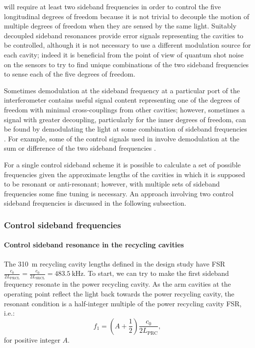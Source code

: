\ETLF{} will require at least two sideband frequencies in order to control the five longitudinal degrees of freedom because it is not trivial to decouple the motion of multiple degrees of freedom when they are sensed by the same light. Suitably decoupled sideband resonances provide error signals representing the cavities to be controlled, although it is not necessary to use a different modulation source for each cavity; indeed it is beneficial from the point of view of quantum shot noise on the sensors to try to find unique combinations of the two sideband frequencies to sense each of the five degrees of freedom.

Sometimes demodulation at the sideband frequency at a particular port of the interferometer contains useful signal content representing one of the degrees of freedom with minimal cross-couplings from other cavities; however, sometimes a signal with greater decoupling, particularly for the inner degrees of freedom, can be found by demodulating the light at some combination of sideband frequencies \cite{Strain2003, Barr2006}. For example, some of the control signals used in \ALIGO{} involve demodulation at the sum or difference of the two sideband frequencies \cite{Abbott2010}.

For a single control sideband scheme it is possible to calculate a set of possible frequencies given the approximate lengths of the cavities in which it is supposed to be resonant or anti-resonant; however, with multiple sets of sideband frequencies some fine tuning is necessary. An approach involving two control sideband frequencies is discussed in the following subsection.

\subsubsection{\label{sec:control-sideband-freqs}Control sideband frequencies}

\paragraph{Control sideband resonance in the recycling cavities}
The \SI{310}{\meter} recycling cavity lengths defined in the design study have \gls{FSR} $\frac{c_0}{2 L_{\text{PRCL}}} = \frac{c_0}{2 L_{\text{SRCL}}} = \SI{483.5}{\kilo\hertz}$. To start, we can try to make the first sideband frequency resonate in the power recycling cavity. As the arm cavities at the operating point reflect the light back towards the power recycling cavity, the resonant condition is a half-integer multiple of the power recycling cavity \gls{FSR}, i.e.:
\begin{equation}
  \label{eq:prc-fsr}
  f_1 = \left(A + \frac{1}{2} \right) \frac{c_0}{2 L_{\text{PRC}}},
\end{equation}
for positive integer $A$.

